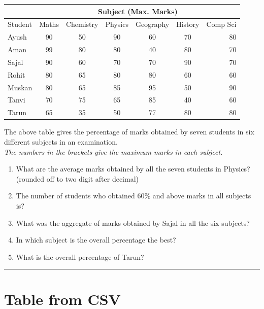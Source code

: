 \documentclass{article}
\begin{document}
\begin{table}[h]
\begin{tabular}{|l|c|c|c|c|c|r|}
\hline
	& \multicolumn{6}{c}{Subject (Max. Marks)} \\ \hline
 Student & Maths	 & Chemistry	 & Physics & Geography & History & Comp Sci \\ \hline
Ayush	& 90 & 50 & 90 & 60 & 70 & 80 \\
Aman	    & 99 & 80 & 80 & 40 & 80 & 70 \\
Sajal	& 90 & 60 & 70 & 70 & 90 & 70 \\
Rohit	& 80 & 65 & 80 & 80 & 60 & 60 \\
Muskan	& 80 & 65 & 85 & 95 & 50 & 90 \\
Tanvi	& 70	 & 75 & 65 & 85 & 40 & 60 \\
Tarun	& 65 & 35 & 50 & 77 & 80	& 80 \\
\hline
\end{tabular}
\end{table}
\noindent \cite{theory} 
The above table gives the percentage of marks obtained by seven students in six different subjects in an examination. \\ 
\textit{The numbers in the brackets give the maximum marks in each subject.}

\begin{enumerate}
\item What are the average marks obtained by all the seven students in Physics? (rounded off to two digit after decimal)
\item The number of students who obtained 60\% and above marks in all subjects is?
\item What was the aggregate of marks obtained by Sajal in all the six subjects?
\item In which subject is the overall percentage the best?
\item What is the overall percentage of Tarun?
\end{enumerate}
\hrule

\section{Table from CSV}
\end{document}
